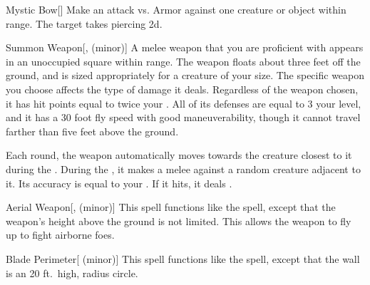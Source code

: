 \lowercase{\hypertarget{spell:Mystic Bow}{}}\label{spell:Mystic Bow}
\begin{apability}[\nth{1}]{\hypertarget{spell:Mystic Bow}{Mystic Bow}}[]
Make an attack vs. Armor against one creature or object within \rngmed range.
\hit The target takes piercing  \plus2d.
\end{apability}
\vspace{0.25em}



\lowercase{\hypertarget{spell:Summon Weapon}{}}\label{spell:Summon Weapon}
\begin{apability}[\nth{1}]{\hypertarget{spell:Summon Weapon}{Summon Weapon}}[,  (minor)]
A melee weapon that you are proficient with appears in an unoccupied square within \rngmed range.
The weapon floats about three feet off the ground, and is sized appropriately for a creature of your size.
The specific weapon you choose affects the type of damage it deals.
Regardless of the weapon chosen, it has hit points equal to twice your .
All of its defenses are equal to 3 \add your level, and it has a 30 foot fly speed with good maneuverability, though it cannot travel farther than five feet above the ground.

Each round, the weapon automatically moves towards the creature closest to it during the .
During the , it makes a melee  against a random creature adjacent to it.
Its accuracy is equal to your .
If it hits, it deals .
\end{apability}
\vspace{0.25em}



\lowercase{\hypertarget{spell:Aerial Weapon}{}}\label{spell:Aerial Weapon}
\begin{apability}[\nth{2}]{\hypertarget{spell:Aerial Weapon}{Aerial Weapon}}[,  (minor)]
This spell functions like the  spell, except that the weapon's height above the ground is not limited.
This allows the weapon to fly up to fight airborne foes.
\end{apability}
\vspace{0.25em}



\lowercase{\hypertarget{spell:Blade Perimeter}{}}\label{spell:Blade Perimeter}
\begin{apability}[\nth{2}]{\hypertarget{spell:Blade Perimeter}{Blade Perimeter}}[ (minor)]
This spell functions like the  spell, except that the wall is an 20 ft.\ high, \areamed radius circle.
\end{apability}
\vspace{0.25em}



